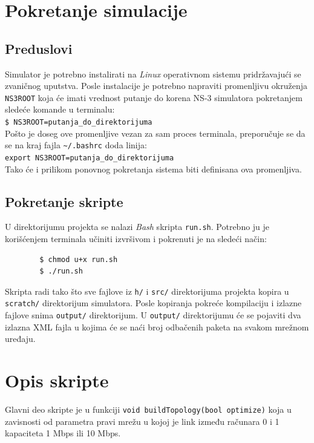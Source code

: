 \documentclass[a4paper, 12pt, projekat]{etf}
\begin{document}
	\section{Pokretanje simulacije}
	\subsection{Preduslovi}
	Simulator je potrebno instalirati na \emph{Linux} operativnom sistemu pri\-drža\-vajući se zvaničnog uputstva. \cite{ns3man} Posle instalacije je potrebno napraviti promenljivu okruženja \verb|NS3ROOT| koja će imati vrednost putanje do korena NS-3 simulatora pokretanjem sledeće komande u terminalu:\\
	
	
	\verb|$ NS3ROOT=putanja_do_direktorijuma|\\
	
	Pošto je doseg ove promenljive vezan za sam proces terminala, preporučuje se da se na kraj fajla \verb|~/.bashrc| doda linija:\\
	
	\verb|export NS3ROOT=putanja_do_direktorijuma|\\
	
	Tako će i prilikom ponovnog pokretanja sistema biti definisana ova promenljiva.
	
	\subsection{Pokretanje skripte}
	U direktorijumu projekta se nalazi \emph{Bash} skripta \verb|run.sh|. Potrebno ju je korišćenjem terminala učiniti izvršivom i pokrenuti je na sledeći način:
	\begin{verbatim}
		$ chmod u+x run.sh
		$ ./run.sh
	\end{verbatim}
	
	
	Skripta radi tako što sve fajlove iz \verb|h/| i \verb|src/| direktorijuma projekta kopira u \verb|scratch/| direktorijum simulatora. Posle kopiranja pokreće kompilaciju i izlazne fajlove snima \verb|output/| direktorijum. U \verb|output/| direktorijumu će se pojaviti dva izlazna XML fajla u kojima će se naći broj odbačenih paketa na svakom mrežnom uređaju.
	
	\section{Opis skripte}
	Glavni deo skripte je u funkciji \verb|void buildTopology(bool optimize)| koja u zavisnosti od parametra pravi mrežu u kojoj je link između računara 0 i 1 kapaciteta 1\! Mbps ili 10\! Mbps.
\end{document}
